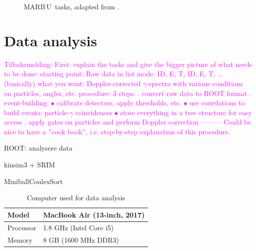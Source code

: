 \documentclass[twoside,english]{uiofysmaster/uiofysmaster}
\newcommand{\MBOU}{MAR\belowbaseline[-2pt]{a}B\stackinset{l}{3pt}{b}{-3pt}{O}{O}\,U}
\begin{document}
\begin{figure}[ht]
	\centering
	
	\caption{\protect\MBOU\ tasks, adapted from \cite{Maraboou}.}
	\label{fig:MARaBOOU}
\end{figure}





\chapter{Data analysis}  

\textcolor{Magenta}{Tilbakemelding: \newline
First: explain the tasks and give the bigger picture of what needs to be done: \newline 
starting point: Raw data in list mode: ID, E, T, ID, E, T, ... (basically) \newline
what you want: Doppler-corrected $\gamma$-spectra with various conditions on particles, angles, etc. \newline
procedure: 3 steps: . convert raw data to ROOT format . event-building: \newline
$\bullet$ calibrate detectors, apply thresholds, etc. \newline
$\bullet$ use correlations to build events: particle-$\gamma$ coincidences \newline
$\bullet$ store everything in a tree structure for easy access . apply gates on particles and perform Doppler correction \newline
--------- \newline
Could be nice to have a ''cook book'', i.e. step-by-step explanation of this procedure.
}

\bigskip

ROOT: analysere data \cite{ROOT}

kinsim3 \cite{kinsim} + SRIM \cite{SRIM}

MiniballCoulexSort \cite{MBCS}

\bigskip


\begin{table}[H] 
\centering 
\caption{Computer used for data analysis}
\label{tab:PC}
\begin{tabular}{ll}
\hline
Model & MacBook Air (13-inch, 2017) \\
\hline
Processor & 1.8 GHz (Intel Core i5) \\
Memory & 8 GB (1600 MHz DDR3) \\
\hline
\end{tabular}
\end{table}
\end{document}
